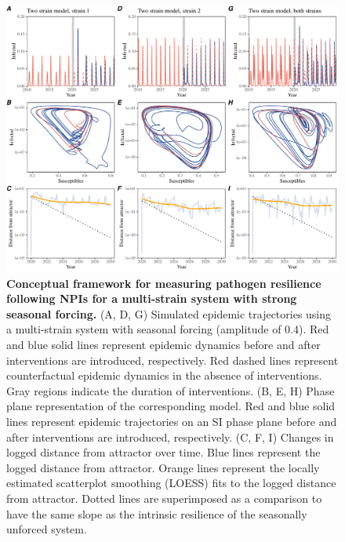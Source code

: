 \documentclass[12pt]{article}
\begin{document}
\begin{figure}[!th]
\includegraphics[width=\textwidth]{../figure2/figure2_multi_strong.pdf}
\caption{
\textbf{Conceptual framework for measuring pathogen resilience following NPIs for a multi-strain system with strong seasonal forcing.}
(A, D, G) Simulated epidemic trajectories using a multi-strain system with seasonal forcing (amplitude of 0.4).
Red and blue solid lines represent epidemic dynamics before and after interventions are introduced, respectively.
Red dashed lines represent counterfactual epidemic dynamics in the absence of interventions.
Gray regions indicate the duration of interventions.
(B, E, H) Phase plane representation of the corresponding model.
Red and blue solid lines represent epidemic trajectories on an SI phase plane before and after interventions are introduced, respectively.
(C, F, I) Changes in logged distance from attractor over time.
Blue lines represent the logged distance from attractor.
Orange lines represent the locally estimated scatterplot smoothing (LOESS) fits to the logged distance from attractor.
Dotted lines are superimposed as a comparison to have the same slope as the intrinsic resilience of the seasonally unforced system.
}
\end{figure}

\pagebreak
\end{document}
